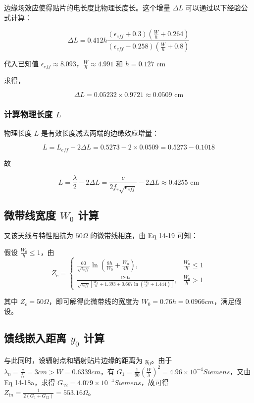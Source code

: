 \documentclass[12pt,a4paper,UTF8]{article}
\begin{document}
边缘场效应使得贴片的电长度比物理长度长。这个增量 $\Delta L$ 可以通过以下经验公式计算：

$$ \Delta L = 0.412h \frac{(\epsilon_{eff}+0.3)(\frac{W}{h}+0.264)}{(\epsilon_{eff}-0.258)(\frac{W}{h}+0.8)} $$

代入已知值 $\epsilon_{eff} \approx 8.093$，$\frac{W}{h} \approx 4.991$ 和 $h = 0.127$ cm

求得，

$$ \Delta L = 0.05232 \times 0.9721 \approx 0.0509 \text{ cm} $$

\subsubsection{计算物理长度 $L$}

物理长度 $L$ 是有效长度减去两端的边缘效应增量：

$$ L = L_{eff} - 2\Delta L = 0.5273 - 2\times 0.0509 = 0.5273 - 0.1018 $$

故

$$L = \frac{\lambda}{2} - 2\Delta L = \frac{c}{2f_r\sqrt{\epsilon_{eff}}} - 2\Delta L \approx 0.4255 \text{ cm}$$

\subsection{微带线宽度 $W_0$ 计算}

又该天线与特性阻抗为 $50\Omega$ 的微带线相连，由 Eq 14-19 可知：

假设 $\frac{W_0}{h} \leq 1$，由
$$ Z_c = \begin{cases}
\frac{60}{\sqrt{\epsilon_{eff}}} \ln(\frac{8h}{W_0} + \frac{W_0}{4h}), & \frac{W_0}{h} \leq 1 \\
\frac{120\pi}{\sqrt{\epsilon_{eff}}[\frac{W_0}{h}+1.393+0.667\ln(\frac{W_0}{h}+1.444)]}, & \frac{W_0}{h} > 1
\end{cases} $$

其中 $Z_c = 50\Omega$，即可解得此微带线的宽度为 $W_0 = 0.76h = 0.0966 cm$，满足假设。

\subsection{馈线嵌入距离 $y_0$ 计算}

与此同时，设辐射点和辐射贴片边缘的距离为 $y_0$。由于 $\lambda_0 = \frac{c}{f_r} = 3 cm > W = 0.6339 cm$，有 $G_1 = \frac{1}{90}(\frac{W}{\lambda})^2 = 4.96\times10^{-4} Siemens$，又由 Eq 14-18a，求得 $G_{12} = 4.079\times10^{-4} Siemens$，故可得 $Z_{in} = \frac{1}{2(G_1+G_{12})} = 553.16\Omega$。
\end{document}
